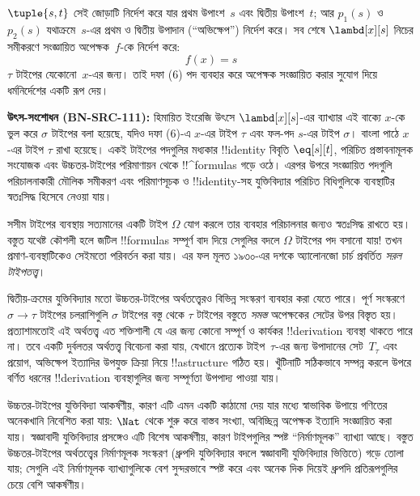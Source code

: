 \documentclass[../../../include/open-logic-section]{subfiles}
\begin{document}
$\tuple{s, t}$ সেই জোড়াটি নির্দেশ করে যার প্রথম উপাংশ~$s$ এবং দ্বিতীয়
উপাংশ~$t$; আর $p_1(s)$ ও~$p_2(s)$ যথাক্রমে~$s$-এর প্রথম ও দ্বিতীয়
উপাদান (“অভিক্ষেপ”) নির্দেশ করে। সব শেষে $\lambd[x][s]$ নিচের
সমীকরণে সংজ্ঞায়িত অপেক্ষক~$f$-কে নির্দেশ করে:
\[
f(x) = s
\]
$\tau$ টাইপের যেকোনো~$x$-এর জন্য। তাই দফা (6) পদ ব্যবহার করে অপেক্ষক
সংজ্ঞায়িত করার সুযোগ দিয়ে ধর্মনির্দেশের একটি রূপ দেয়।
\par\smallskip\noindent\textnormal{\small\textbf{উৎস-সংশোধন (BN-SRC-111):} হিমায়িত ইংরেজি উৎসে $\lambd[x][s]$-এর ব্যাখ্যার এই বাক্যে $x$-কে ভুল করে $\sigma$ টাইপের বলা হয়েছে, যদিও দফা (6)-এ $x$-এর টাইপ $\tau$ এবং ফল-পদ $s$-এর টাইপ $\sigma$। বাংলা পাঠে $x$-এর টাইপ $\tau$ রাখা হয়েছে।} %
একই টাইপের পদগুলির মধ্যকার !!{identity} বিবৃতি $\eq[s][t]$, পরিচিত
প্রস্তাবনামূলক সংযোজক এবং উচ্চতর-টাইপের পরিমাণায়ন থেকে
!!^{formula}s গড়ে ওঠে। এরপর উপরে সংজ্ঞায়িত পদগুলি পরিচালনাকারী মৌলিক
সমীকরণ এবং পরিমাণসূচক ও !!{identity}-সহ যুক্তিবিদ্যার পরিচিত বিধিগুলিকে
ব্যবস্থাটির স্বতঃসিদ্ধ হিসেবে নেওয়া যায়।

সসীম টাইপের ব্যবস্থায় সত্যমানের একটি টাইপ $\Omega$ যোগ করলে তার
ব্যবহার পরিচালনার জন্যও স্বতঃসিদ্ধ রাখতে হয়। বস্তুত যথেষ্ট কৌশলী হলে
জটিল !!{formula}s সম্পূর্ণ বাদ দিয়ে সেগুলির বদলে $\Omega$ টাইপের পদ
বসানো যায়!{} তখন প্রমাণ-ব্যবস্থাটিকেও সেইমতো পরিবর্তন করা যায়। এর
ফল মূলত ১৯৩০-এর দশকে অ্যালোনজো চার্চ প্রবর্তিত \emph{সরল
টাইপতত্ত্ব}।

দ্বিতীয়-ক্রমের যুক্তিবিদ্যার মতো উচ্চতর-টাইপের অর্থতত্ত্বেরও বিভিন্ন
সংস্করণ ব্যবহার করা যেতে পারে। পূর্ণ সংস্করণে $\sigma \to \tau$
টাইপের চলরাশিগুলি $\sigma$ টাইপের বস্তু থেকে $\tau$ টাইপের বস্তুতে
\emph{সমস্ত} অপেক্ষকের সেটের উপর বিস্তৃত হয়। প্রত্যাশামতোই এই
অর্থতত্ত্ব এত শক্তিশালী যে এর জন্য কোনো সম্পূর্ণ ও কার্যকর
!!{derivation} ব্যবস্থা থাকতে পারে না। তবে একটি দুর্বলতর অর্থতত্ত্ব
বিবেচনা করা যায়, যেখানে প্রত্যেক টাইপ~$\tau$-এর জন্য উপাদানের
সেট~$T_\tau$ এবং প্রয়োগ, অভিক্ষেপ ইত্যাদির উপযুক্ত ক্রিয়া নিয়ে
!!a{structure} গঠিত হয়। খুঁটিনাটি সঠিকভাবে সম্পন্ন করলে উপরে বর্ণিত
ধরনের !!{derivation} ব্যবস্থাগুলির জন্য সম্পূর্ণতা উপপাদ্য পাওয়া যায়।

উচ্চতর-টাইপের যুক্তিবিদ্যা আকর্ষণীয়, কারণ এটি এমন একটি কাঠামো দেয়
যার মধ্যে স্বাভাবিক উপায়ে গণিতের অনেকখানি নিবেশিত করা যায়: $\Nat$
থেকে শুরু করে বাস্তব সংখ্যা, অবিচ্ছিন্ন অপেক্ষক ইত্যাদি সংজ্ঞায়িত করা
যায়। স্বজ্ঞাবাদী যুক্তিবিদ্যার প্রসঙ্গেও এটি বিশেষ আকর্ষণীয়, কারণ
টাইপগুলির স্পষ্ট “নির্মাণমূলক” ব্যাখ্যা আছে। বস্তুত উচ্চতর-টাইপের
অর্থতত্ত্বের নির্মাণমূলক সংস্করণ (ধ্রুপদি যুক্তিবিদ্যার বদলে স্বজ্ঞাবাদী
যুক্তিবিদ্যার ভিত্তিতে) গড়ে তোলা যায়; সেগুলি এই নির্মাণমূলক
ব্যাখ্যাগুলিকে বেশ সুন্দরভাবে স্পষ্ট করে এবং অনেক দিক দিয়েই ধ্রুপদি
প্রতিরূপগুলির চেয়ে বেশি আকর্ষণীয়।
\end{document}
